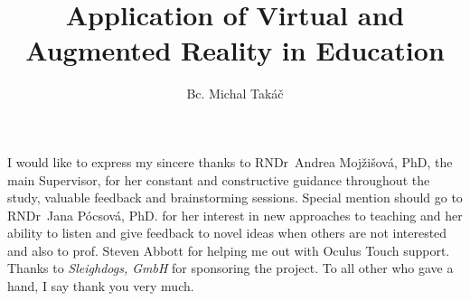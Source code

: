 \documentclass[]{tukethesis}
\author{Bc. Michal Takáč}
\title{Application of Virtual and Augmented Reality in Education}
\subtitle{}
\begin{document}
\renewcommand\theHfigure{\theHsection.\arabic{figure}}
\renewcommand\theHtable{\theHsection.\arabic{table}}

\firstpage

\titlepage


%
%

\abstrakte %


\endabstract %

\assignthesis

\declaration

\acknowledgement %
I would like to express my sincere thanks to RNDr~Andrea
Mojžišová, PhD, the main Supervisor, for her constant and constructive guidance throughout the study, valuable feedback and brainstorming sessions. Special mention should go
to RNDr~Jana Pócsová, PhD. for her interest in new approaches to teaching and her ability to listen and give feedback to novel ideas when others are not interested and also to prof. Steven Abbott for helping me out with Oculus Touch support. Thanks to \textsl{Sleighdogs, GmbH} for sponsoring the project. To all other who gave a hand, I say thank you
very much.
\endacknowledgement
\end{document}
